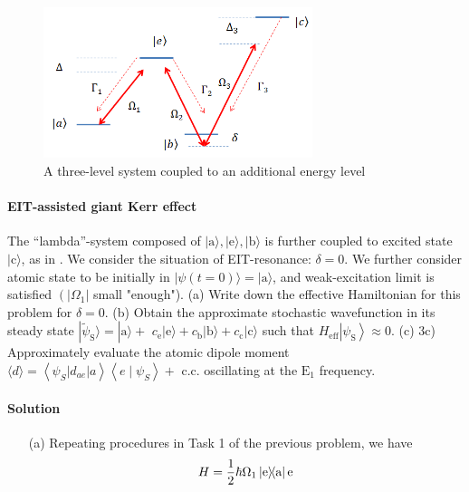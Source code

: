 \documentclass[hyperref, a4paper]{article}
\newcommand*{\ee}{\mathrm{e}}
\begin{document}
\paragraph{}

\begin{figure}
    \centering
    \includegraphics[width=0.7\textwidth]{fig3.png}
    \caption{A three-level system coupled to an additional energy level}
    \label{fig:sys-3}
\end{figure}

\paragraph{EIT-assisted giant Kerr effect} The ``lambda''-system composed of $|\text{a}\rangle,|\text{e}\rangle,|\text{b}\rangle$ is further coupled to excited state $|\text{c}\rangle$, as in . We consider the situation of EIT-resonance: $\delta=0$. We further consider atomic state to be initially in $|\psi(t=0)\rangle=|\mathrm{a}\rangle$, and weak-excitation limit is satisfied $\left(\left|\Omega_{1}\right|\right.$ small "enough").
(a) Write down the effective Hamiltonian for this problem for $\delta=0$.
(b) Obtain the approximate stochastic wavefunction in its steady state $|\tilde{\psi}_\text{S}\rangle=|\text{a}\rangle+$ ${c}_{\mathrm{e}}|\text{e}\rangle+c_\text{b}|\text{b}\rangle+c_\text{c}|\text{c}\rangle$ such that ${H}_{\mathrm{eff}}\left|\psi_{\mathrm{S}}\right\rangle \approx 0$.
(c) 3c) Approximately evaluate the atomic dipole moment $\langle {d}\rangle=\left\langle\psi_{S}\left|d_{a e}\right| a\right\rangle\left\langle e \mid \psi_{S}\right\rangle+$ c.c. oscillating at the $\mathrm{E}_{1}$ frequency.

\paragraph{Solution} \begin{itemize}
\item[(a)] Repeating procedures in Task 1 of the previous problem, we have 
\begin{equation}
    H = \frac{1}{2} \hbar \Omega_1 \dyad*{\text{e}}{\text{a}} \ee^{}
\end{equation}  
\end{itemize}

\paragraph{}
\end{document}
